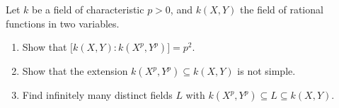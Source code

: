 \begin{problem}
  Let \(k\) be a field of characteristic \(p>0\), and \(k(X,Y)\) the field
  of rational functions in two variables.
\begin{enumerate}[label=(\alph*)]
\item Show that \(\bigl[k(X,Y):k(X^p,Y^p)\bigr]=p^2\).
\item Show that the extension \(k(X^p,Y^p)\subseteq k(X,Y)\) is not simple.
\item Find infinitely many distinct fields \(L\) with
  \(k(X^p,Y^p)\subseteq L\subseteq k(X,Y)\).
\end{enumerate}
\end{problem}
\begin{solution}
\end{solution}


